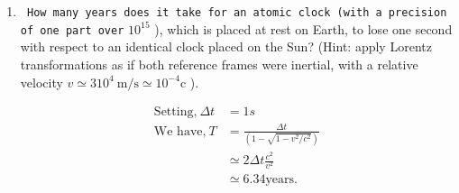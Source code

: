 \begin{enumerate}[ label=\color{ocre}\textbf{\arabic*.}]
\item \texttt{ How many years does it take for an atomic clock (with a precision of one part over} $10^{15}$ ), which is placed at rest on Earth, to lose one second with respect to an identical clock placed on the Sun? (Hint: apply Lorentz transformations as if both reference frames were inertial, with a relative velocity $v \simeq 310^{4} \mathrm{~m} / \mathrm{s} \simeq 10^{-4} \mathrm{c}$ ).
\begin{answer}
	\begin{align*}
	\text{Setting,}\ \Delta t&=1s\\ \text{We have,}\ T&=\frac{\Delta t}{\left(1-\sqrt{1-v^{2} / c^{2}}\right)} \\& \simeq 2 \Delta t \frac{c^{2}}{v^{2}}\\& \simeq 6.34 \text{years.}
	\end{align*}
\end{answer}
\end{enumerate}




